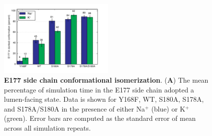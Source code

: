 \begin{refsection}
\begin{figure}[!ptb]
\centering
\includegraphics[width=0.5\textwidth]{nav6/Nav6Fig2}
\caption[E177 side chain conformational isomerization]{\textbf{E177 side chain conformational isomerization}. (\textbf{A}) The mean percentage of simulation time in the E177 side chain adopted a lumen-facing state. Data is shown for Y168F, WT, S180A, S178A, and S178A/S180A in the presence of either Na$^+$ (blue) or K$^+$ (green). Error bars are computed as the standard error of mean across all simulation repeats.}
\label{fig:nav6fig2}
\end{figure}


\end{refsection}
